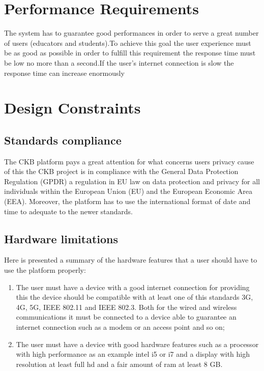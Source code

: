\section{Performance Requirements}
The system has to guarantee good performances in order to serve a great number of users (educators and students).To achieve this goal the user experience must be as good as possible in order to fulfill this requirement the response time must be low no more than a second.If the user’s internet connection is slow the response time can increase  enormously

\section{Design Constraints}

\subsection{Standards compliance}
The CKB platform pays a great attention for what concerns users privacy cause of this the CKB project is in compliance with the  General Data Protection Regulation
(GPDR) a regulation in EU law on data protection and privacy for all
individuals within the European Union (EU) and the European Economic Area (EEA).
Moreover, the platform has to use the international format of date and time to adequate to the newer standards.
\subsection{Hardware limitations}
Here is presented a summary of the hardware features that a user should have to use the platform properly:
    \begin{enumerate}[label=\textbullet]
        \item The user must have a device with a good internet connection for providing this the device should be compatible with at least one of this standards 3G, 4G, 5G, IEEE 802.11 and  IEEE 802.3. Both for the wired and wireless communications it must be connected to a device able to guarantee an internet connection such as a modem or an access point and so on;
        \item The user must have a device with good hardware features such as a processor with high performance as an example intel i5 or i7 and a display with high resolution at least full hd and a fair amount of ram at least 8 GB.
        
    \end{enumerate}



